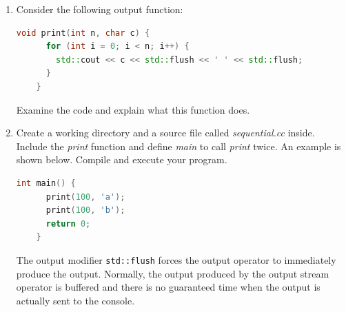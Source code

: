 \documentclass[12pt]{book}
\begin{document}
\begin{enumerate}[label=Activity \arabic*:]
  
\item Consider the following output function:

  \begin{lstlisting}[language=C++]
    void print(int n, char c) {
      for (int i = 0; i < n; i++) {
        std::cout << c << std::flush << ' ' << std::flush;
      }
    }
  \end{lstlisting}

  Examine the code and explain what this function does.

\item Create a working directory and a source file called \emph{sequential.cc} inside. Include the \emph{print} function and define \emph{main} to call \emph{print} twice. An example is shown below. Compile and execute your program.

  \begin{lstlisting}[language=c]
    int main() {
      print(100, 'a');
      print(100, 'b');
      return 0;
    }
  \end{lstlisting}

 The output modifier \lstinline$std::flush$ forces the output operator to immediately produce the output. Normally, the output produced by the output stream operator is buffered and there is no guaranteed time when the output is actually sent to the console.


\end{enumerate}




\end{document}
